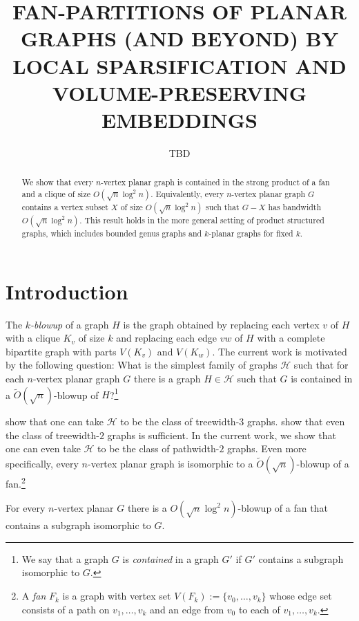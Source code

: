 \documentclass{patmorin}
\title{\MakeUppercase{Fan-Partitions of Planar Graphs (and Beyond)
  \newline by Local Sparsification and Volume-Preserving Embeddings}}
\author{TBD}
\date{}
\newcommand{\defin}[1]{\emph{\textcolor{brightmaroon}{#1}}}
\begin{document}
\maketitle

\begin{abstract}
  We show that every $n$-vertex planar graph is contained in the strong product of a fan and a clique of size $O(\sqrt{n}\log^2 n)$.  Equivalently, every $n$-vertex planar graph $G$ contains a vertex subset $X$ of size $O(\sqrt{n}\log^2 n)$ such that $G-X$ has bandwidth $O(\sqrt{n}\log^2 n)$.  This result holds in the more general setting of product structured graphs, which includes bounded genus graphs and $k$-planar graphs for fixed $k$.
\end{abstract}

\section{Introduction}

The \defin{$k$-blowup} of a graph $H$ is the graph obtained by replacing each vertex $v$ of $H$ with a clique $K_v$ of size $k$ and replacing each edge $vw$ of $H$ with a complete bipartite graph with parts $V(K_v)$ and $V(K_w)$.  The current work is motivated by the following question: What is the simplest family of graphs $\mathcal{H}$ such that for each $n$-vertex planar graph $G$ there is a graph $H\in\mathcal{H}$ such that $G$ is contained in a $\tilde{O}(\sqrt{n})$-blowup of $H$?\footnote{We say that a graph $G$ is \defin{contained} in a graph $G'$ if $G'$ contains a subgraph isomorphic to $G$.}

\citet{illingworth.scott.ea:product} show that one can take $\mathcal{H}$ to be the class of treewidth-$3$ graphs. \citet{distel.dujmovic.ea:product} show that even the class of treewidth-$2$ graphs is sufficient.  In the current work, we show that one can even take $\mathcal{H}$ to be the class of pathwidth-$2$ graphs.  Even more specifically, every $n$-vertex planar graph is isomorphic to a $\tilde{O}(\sqrt{n})$-blowup of a fan.\footnote{A \defin{fan} $F_k$ is a graph with vertex set $V(F_k):=\{v_0,\ldots,v_k\}$ whose edge set consists of a path on $v_1,\ldots,v_k$ and an edge from $v_0$ to each of $v_1,\ldots,v_k$.}
\begin{thm}\label{main_thm_planar}
  For every $n$-vertex planar $G$ there is a $O(\sqrt{n}\log^2 n)$-blowup of a fan that contains a subgraph isomorphic to $G$.
\end{thm}
\end{document}
